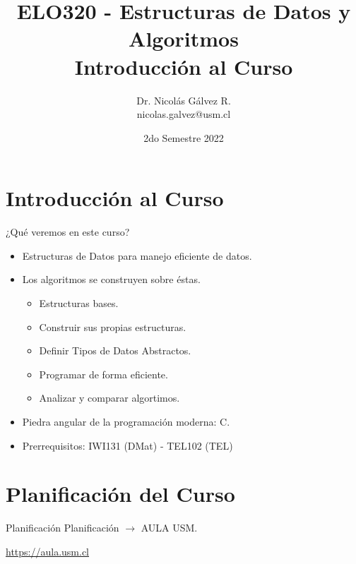 \documentclass{beamer}
\title{ELO320 - Estructuras de Datos y Algoritmos\\Introducción al Curso}
\author{Dr. Nicolás Gálvez R.\\{\small nicolas.galvez@usm.cl}}
\institute{Ing. Civil Telemática - Departamento de Electrónica}
\date{2do Semestre 2022}
\begin{document}
\frame{\titlepage}


\section{Introducción al Curso}
\begin{frame}{¿Qué veremos en este curso?}
\begin{itemize}
\item Estructuras de Datos para manejo eficiente de datos.
\item Los algoritmos se construyen sobre éstas.
\begin{itemize}
	\item Estructuras bases.
	\item Construir sus propias estructuras.
	\item Definir Tipos de Datos Abstractos. 
	\item Programar de forma eficiente.
	\item Analizar y comparar algortimos.
\end{itemize}
\item Piedra angular de la programación moderna: C. 
\item Prerrequisitos: IWI131 (DMat) - TEL102 (TEL)
\end{itemize}
\end{frame}

\section{Planificación del Curso}
\begin{frame}{Planificación}
Planificación $\rightarrow$ AULA USM.

{\Large\begin{center}\url{https://aula.usm.cl}\end{center}}
\end{frame}
\end{document}
